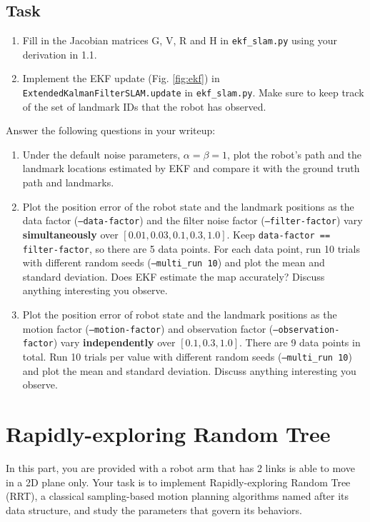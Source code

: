 \documentclass[tp]{lcc}
\begin{document}
\subsection*{Task}
\begin{enumerate}
    \item Fill in the Jacobian matrices G, V, R and H in \texttt{ekf\_slam.py} using your derivation in 1.1.
    \item Implement the EKF update (Fig. \ref{fig:ekf}) in \texttt{ExtendedKalmanFilterSLAM.update} in \texttt{ekf\_slam.py}. Make sure to keep track of the set of landmark IDs that the robot has observed.
\end{enumerate}

Answer the following questions in your writeup:
\begin{enumerate}
    \item Under the default noise parameters, $\alpha=\beta=1$, plot the robot's path and the landmark locations estimated by EKF and compare it with the ground truth path and landmarks.
    \item Plot the position error of the robot state and the landmark positions as the data factor (\texttt{--data-factor}) and the filter noise factor (\texttt{--filter-factor}) vary \textbf{simultaneously} over $[0.01,0.03,0.1,0.3,1.0]$. Keep \texttt{data-factor == filter-factor}, so there are 5 data points. For each data point, run 10 trials with different random seeds (\texttt{--multi\_run 10}) and plot the mean and standard deviation. Does EKF estimate the map accurately? Discuss anything interesting you observe.
    \item Plot the position error of robot state and the landmark positions as the motion factor (\texttt{--motion-factor}) and observation factor (\texttt{--observation-factor}) vary \textbf{independently} over $[0.1,0.3,1.0]$. There are 9 data points in total. Run 10 trials per value with different random seeds (\texttt{--multi\_run 10}) and plot the mean and standard deviation. Discuss anything interesting you observe.
\end{enumerate}

\section{Rapidly-exploring Random Tree}
In this part, you are provided with a robot arm that has 2 links is able to move in a 2D plane only. Your task is to implement Rapidly-exploring Random Tree (RRT), a classical sampling-based motion planning algorithms named after its data structure, and study the parameters that govern its behaviors.
\end{document}

